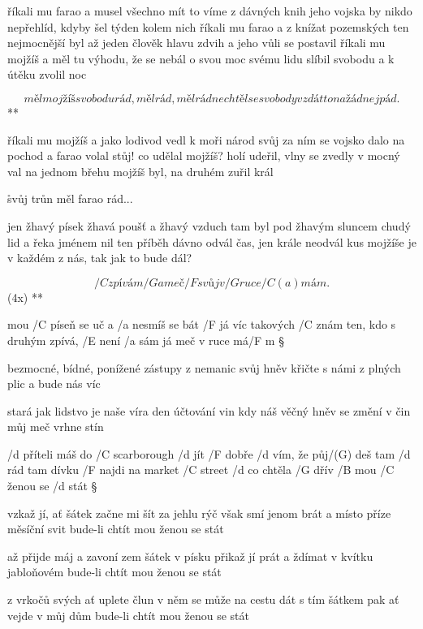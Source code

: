 říkali mu farao a musel všechno mít to víme z dávných knih
jeho vojska by nikdo nepřehlíd, kdyby šel týden kolem nich \s
říkali mu farao a z knížat pozemských ten nejmocnější byl
až jeden člověk hlavu zdvih a jeho vůli se postavil \s
říkali mu mojžíš a měl tu výhodu, že se nebál o svou moc
svému lidu slíbil svobodu a k útěku zvolil noc \s

\R \[ měl mojžíš svobodu rád, měl rád, měl rád
   nechtěl se svobody vzdát to na žádnej pád.\]**

říkali mu mojžíš a jako lodivod vedl k moři národ svůj
za ním se vojsko dalo na pochod a farao volal stůj! \s
co udělal mojžíš? holí udeřil, vlny se zvedly v mocný val
na jednom břehu mojžíš byl, na druhém zuřil král \s

\r svůj trůn měl farao rád...

jen žhavý písek žhavá poušť a žhavý vzduch tam byl
pod žhavým sluncem chudý lid a řeka jménem nil \s
ten příběh dávno odvál čas, jen krále neodvál
kus mojžíše je v každém z nás, tak jak to bude dál?




\R \[ /C zpívám /G a meč /F svůj v /G ruce /{C (a)} mám. \](4x) **

mou /C píseň se uč a /a nesmíš se bát
/F já víc takových /C znám
ten, kdo s druhým zpívá, /E není /a sám
já meč v ruce má/F m \S

bezmocné, bídné, ponížené
zástupy z nemanic
svůj hněv křičte s námi z plných plic
a bude nás víc \s

stará jak lidstvo je naše víra
den účtování vin
kdy náš věčný hněv se změní v čin
můj meč vrhne stín \s




/d příteli máš do /C scarborough /d jít
/F dobře /d vím, že půj/(G) deš tam /d rád
tam dívku /F najdi na market /C street
/d co chtěla /G dřív /B mou /C ženou se /d stát \S

vzkaž jí, ať šátek začne mi šít
za jehlu rýč však smí jenom brát
a místo příze měsíční svit
bude-li chtít mou ženou se stát \s

až přijde máj a zavoní zem
šátek v písku přikaž jí prát
a ždímat v kvítku jabloňovém
bude-li chtít mou ženou se stát \s

z vrkočů svých ať uplete člun
v něm se může na cestu dát
s tím šátkem pak ať vejde v můj dům
bude-li chtít mou ženou se stát \s

